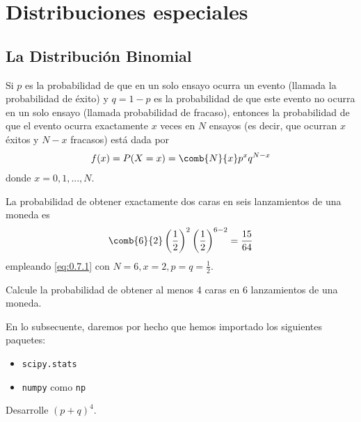 \chapter{Distribuciones especiales}


\section{La Distribución Binomial}


 Si $p$ es la probabilidad de que en un solo ensayo ocurra un evento (llamada la probabilidad de éxito) y $q = 1 - p$ es la
probabilidad de que este evento no ocurra en un solo ensayo (llamada probabilidad de fracaso), entonces la probabilidad de que el evento ocurra exactamente $x$ veces en $N$ ensayos (es decir, que ocurran $x$ éxitos y $N - x$ fracasos) está
dada por
\begin{align}
 \label{eq:0.7.1}
 f(x)=P(X=x)=\comb{N}{x}p^{x}q^{N-x}
\end{align}
donde $x=0,1,...,N.$


 \begin{ejemplo}
  \label{exmp:0.7.1}
  La probabilidad de obtener exactamente dos caras en seis lanzamientos de una moneda es
  \begin{align}
   \comb{6}{2}\left( \dfrac{1}{2} \right)^{2}\left( \dfrac{1}{2} \right)^{6-2}=\dfrac{15}{64}
  \end{align}
empleando \eqref{eq:0.7.1} con $N=6, x=2, p=q=\frac{1}{2}.$
 \end{ejemplo}



\begin{ejemplo}
 \label{exmp:0.7.2}
 Calcule la probabilidad de obtener al menos 4 caras en 6 lanzamientos de una moneda.
\end{ejemplo}



 En lo subsecuente, daremos por hecho que hemos importado los siguientes paquetes:
 \begin{itemize}
  \item \texttt{scipy.stats}
  \item \texttt{numpy} como \texttt{np}
 \end{itemize}





 \begin{ejemplo}
  \label{exmp:0.7.3}
  Desarrolle $\left( p+q \right)^{4}.$
 \end{ejemplo}



